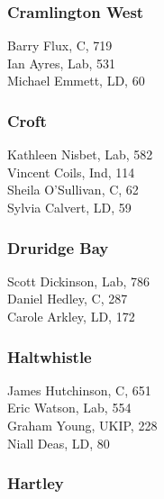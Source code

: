 \documentclass[a4paper,openany,10pt]{book}
\begin{document}
\subsubsection*{Cramlington West}



Barry Flux, C, 719\\
Ian Ayres, Lab, 531\\
Michael Emmett, LD, 60\\


\subsubsection*{Croft}



Kathleen Nisbet, Lab, 582\\
Vincent Coils, Ind, 114\\
Sheila O'Sullivan, C, 62\\
Sylvia Calvert, LD, 59\\


\subsubsection*{Druridge Bay}



Scott Dickinson, Lab, 786\\
Daniel Hedley, C, 287\\
Carole Arkley, LD, 172\\


\subsubsection*{Haltwhistle}



James Hutchinson, C, 651\\
Eric Watson, Lab, 554\\
Graham Young, UKIP, 228\\
Niall Deas, LD, 80\\


\subsubsection*{Hartley}
\end{document}
